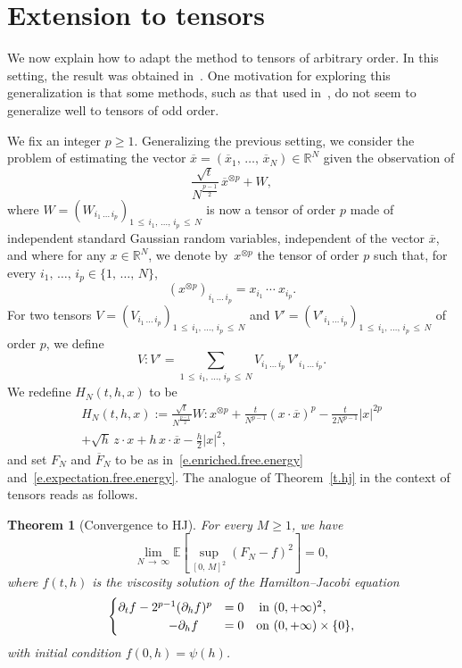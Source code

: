 \documentclass[10pt]{amsart}
\newtheorem{theo}{Theorem}[section]
\theoremstyle{definition}\newtheorem{defi}[theo]{Definition}\newtheorem{rema}[theo]{Remark}\newtheorem{exam}[theo]{Example}\newtheorem{exem}[theo]{Example}\newtheorem{nota}[theo]{Notation}
\newcommand{\R}{\mathbb{R}}
\newcommand{\E}{\mathbb{E}}
\newcommand{\1}{\mathds{1}}
\renewcommand{\le}{\leqslant}
\renewcommand{\ge}{\geqslant}
\renewcommand{\bar}{\overline}
\begin{document}
\section{Extension to tensors}\label{s.tensor}

We now explain how to adapt the method to tensors of arbitrary order. In this setting, the result was obtained in~\cite{bm1,les}. One motivation for exploring this generalization is that some methods, such as that used in~\cite{eak}, do not seem to generalize well to tensors of odd order.


We fix an integer $p \ge 1$. Generalizing the previous setting, we consider the problem of estimating the vector $\bar x = (\bar x_1,\,\ldots,\,\bar x_N) \in \R^N$ given the observation of
\[
\frac{\sqrt{t}}{N^{\frac{p-1}{2}}} \, \bar x^{\otimes p}+ W,
\]
where $W = (W_{i_1\,\ldots\,i_p})_{1 \,\le\,i_1,\,\ldots,\,i_p\,\le\,N}$ is now a tensor of order $p$ made of independent standard Gaussian random variables, independent of the vector $\bar x$, and where for any $x \in \R^N$, we denote by~$x^{\otimes p}$ the tensor of order $p$ such that, for every $i_1,\,\ldots,\,i_p \in \{1,\,\ldots,\,N\}$,
\[
(x^{\otimes p})_{i_1\,\ldots\,i_p} = x_{i_1} \, \cdots \ x_{i_p}.
\]
For two tensors $V = (V_{i_1\,\ldots\,i_p})_{1\,\le\,i_1,\,\ldots,\,i_p\,\le\,N}$ and $V' = (V'_{i_1\,\ldots\,i_p})_{1\,\le\,i_1,\,\ldots,\,i_p\,\le\,N}$ of order $p$, we define
\[
V : V' = \sum_{1\,\le\,i_1,\,\ldots,\,i_p\,\le\,N} V_{i_1\,\ldots \,i_p} \, V'_{i_1\,\ldots\,i_p}.
\]
We redefine $H_N(t,h,x)$ to be
\begin{multline*}
H_N(t,{h},x) :=
\frac{\sqrt{t}}{N^{\frac{p-1}{2}}} W : x^{\otimes p} + \frac t {N^{p-1}} (x \cdot \bar x)^p - \frac t {2N^{p-1}} |x|^{2p}
\\
+ \sqrt{h} \, z \cdot x + {h} \, x \cdot \bar x - \frac {h} 2 |x|^2,
\end{multline*}
and set $F_N$ and $\bar F_N$ to be as in~\eqref{e.enriched.free.energy} and~\eqref{e.expectation.free.energy}. The analogue of Theorem~\ref{t.hj} in the context of tensors reads as follows.




\begin{theo}[Convergence to HJ]\label{t.hj.tensor}
For every $M \ge 1$, we have
\[
\lim_{N\,\to\,\infty} \E \left[\sup_{\left[0,\,M\right]^2} (F_N - f)^2 \right] = 0,
\]
where $f(t,h)$ is the viscosity solution of the Hamilton--Jacobi equation
\begin{equation}\label{e.hj.tensor}
\begin{cases}
\partial_t f - 2^{p-1}(\partial_{h} f)^p & = 0 \quad\:  \text{in } (0,+\infty)^2, \\
\mkern73mu- \partial_h f & = 0 \quad \text{on } (0,+\infty) \times \{0\},
\end{cases}
\end{equation}
with initial condition $f(0,h) = \psi(h)$.
\end{theo}
\end{document}
